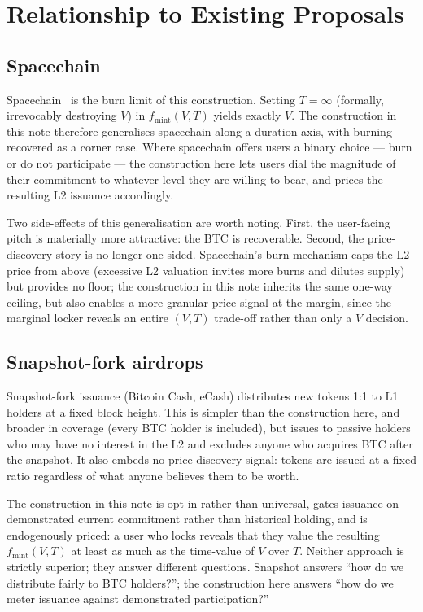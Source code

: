 \documentclass[11pt,a4paper]{article}
\newcommand{\fmint}{f_{\mathrm{mint}}}
\begin{document}
\section{Relationship to Existing Proposals}

\subsection{Spacechain}

Spacechain~\cite{spacechain} is the burn limit of this construction. Setting $T = \infty$ (formally, irrevocably destroying $V$) in $\fmint(V, T)$ yields exactly $V$. The construction in this note therefore generalises spacechain along a duration axis, with burning recovered as a corner case. Where spacechain offers users a binary choice --- burn or do not participate --- the construction here lets users dial the magnitude of their commitment to whatever level they are willing to bear, and prices the resulting L2 issuance accordingly.

Two side-effects of this generalisation are worth noting. First, the user-facing pitch is materially more attractive: the BTC is recoverable. Second, the price-discovery story is no longer one-sided. Spacechain's burn mechanism caps the L2 price from above (excessive L2 valuation invites more burns and dilutes supply) but provides no floor; the construction in this note inherits the same one-way ceiling, but also enables a more granular price signal at the margin, since the marginal locker reveals an entire $(V, T)$ trade-off rather than only a $V$ decision.

\subsection{Snapshot-fork airdrops}

Snapshot-fork issuance (Bitcoin Cash, eCash) distributes new tokens 1:1 to L1 holders at a fixed block height. This is simpler than the construction here, and broader in coverage (every BTC holder is included), but issues to passive holders who may have no interest in the L2 and excludes anyone who acquires BTC after the snapshot. It also embeds no price-discovery signal: tokens are issued at a fixed ratio regardless of what anyone believes them to be worth.

The construction in this note is opt-in rather than universal, gates issuance on demonstrated current commitment rather than historical holding, and is endogenously priced: a user who locks reveals that they value the resulting $\fmint(V, T)$ at least as much as the time-value of $V$ over $T$. Neither approach is strictly superior; they answer different questions. Snapshot answers ``how do we distribute fairly to BTC holders?''; the construction here answers ``how do we meter issuance against demonstrated participation?''
\end{document}
